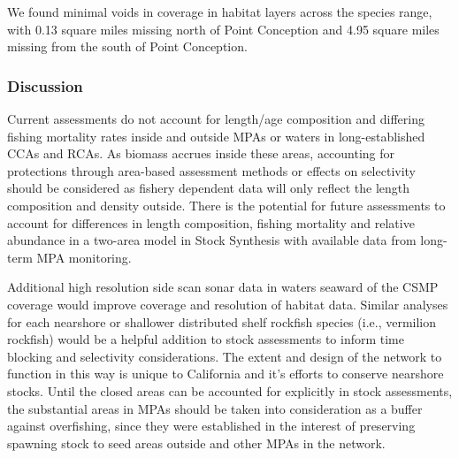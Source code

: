 \documentclass[11pt,
  english,
  a4paper,
]{article}
\begin{document}
We found minimal voids in coverage in habitat layers across the species range, with 0.13 square miles missing north of Point Conception and 4.95 square miles missing from the south of Point Conception.

\leavevmode\tagmcend\tagstructend\par


\hypertarget{discussion}{%
\subsubsection{Discussion}\label{discussion}}

\leavevmode\tagmcend\tagstructend


Current assessments do not account for length/age composition and differing fishing mortality rates inside and outside MPAs or waters in long-established CCAs and RCAs. As biomass accrues inside these areas, accounting for protections through area-based assessment methods or effects on selectivity should be considered as fishery dependent data will only reflect the length composition and density outside. There is the potential for future assessments to account for differences in length composition, fishing mortality and relative abundance in a two-area model in Stock Synthesis with available data from long-term MPA monitoring.

\leavevmode\tagmcend\tagstructend\par


Additional high resolution side scan sonar data in waters seaward of the CSMP coverage would improve coverage and resolution of habitat data. Similar analyses for each nearshore or shallower distributed shelf rockfish species (i.e., vermilion rockfish) would be a helpful addition to stock assessments to inform time blocking and selectivity considerations. The extent and design of the network to function in this way is unique to California and it's efforts to conserve nearshore stocks. Until the closed areas can be accounted for explicitly in stock assessments, the substantial areas in MPAs should be taken into consideration as a buffer against overfishing, since they were established in the interest of preserving spawning stock to seed areas outside and other MPAs in the network.

\leavevmode\tagmcend\tagstructend\par
\end{document}
